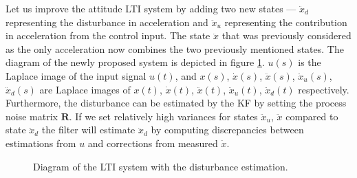 Let us improve the attitude LTI system by adding two new states --- $\ddot{x}_d$ representing the disturbance in acceleration and $\ddot{x}_u$ representing the contribution in acceleration from the control input. The state $\ddot{x}$ that was previously considered as the only acceleration now combines the two previously mentioned states. The diagram of the newly proposed system is depicted in figure \ref{fig:LTI_with_disturbances}. $u(s)$ is the Laplace image of the input signal $u(t)$, and $x(s)$, $\dot{x}(s)$, $\ddot{x}(s)$, $\ddot{x}_u(s)$, $\ddot{x}_d(s)$ are Laplace images of $x(t)$, $\dot{x}(t)$, $\ddot{x}(t)$, $\ddot{x}_u(t)$, $\ddot{x}_d(t)$ respectively. Furthermore, the disturbance can be estimated by the KF by setting the process noise matrix $\textbf{R}$. If we set relatively high variances for states $\ddot{x}_u$, $\ddot{x}$ compared to state $\ddot{x}_d$ the filter will estimate $\ddot{x}_d$ by computing discrepancies between estimations from $u$ and corrections from measured $\dot{x}$.

\begin{figure}[h]
\centering
{}
\caption{Diagram of the LTI system with the disturbance estimation.}
\label{fig:LTI_with_disturbances}
\end{figure}

